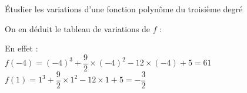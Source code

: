 \begin{methodeTitre}{Étudier les variations d'une fonction polynôme du troisième degré}
\begin{enumMet}
		\item On en déduit le tableau de variations de $f$ :\\
		\begin{center}
		\end{center}
		En effet :\\
		$f(-4)=(-4)^{3}+\dfrac{9}{2} \times(-4)^{2}-12 \times(-4)+5=61$\\
		$f(1)=1^{3}+\dfrac{9}{2} \times 1^{2}-12 \times 1+5=-\dfrac{3}{2}$\\
	\end{enumMet}
\end{methodeTitre}







